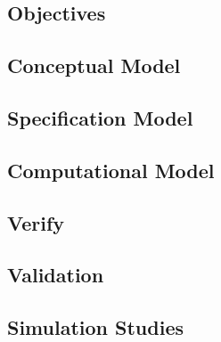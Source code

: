 \subsection{Objectives}


\subsection{Conceptual Model}


\subsection{Specification Model}


\subsection{Computational Model}


\subsection{Verify}


\subsection{Validation}


\subsection{Simulation Studies}
